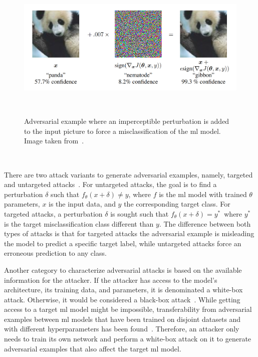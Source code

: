 \begin{figure}[ht]
  \includegraphics[scale=0.35]{figures/adversarial_example.png}
  \centering
  \caption{Adversarial example where an imperceptible perturbation is added to the input picture to force a misclassification of the \ac{ml} model. Image taken from~\cite{goodfellow_explaining_2015}.}
~\label{fig:adversarial_example}
\end{figure} \

There are two attack variants to generate adversarial examples, namely,
targeted and untargeted attacks~\cite{huang_adversarial_nodate}. For
untargeted attacks, the goal is to find a perturbation \(\delta\) such
that \(f_{\theta}\left(x + \delta\right) \neq y\), where \(f\) is the
\ac{ml} model with trained \(\theta\) parameters, \(x\) is the input
data, and \(y\) the corresponding target class. For targeted attacks,
a perturbation \(\delta\) is sought such that \(f_{\theta}
\left(x + \delta\right) = y^{\ast}\)\, where \(y^{\ast}\) is the
target misclassification class different than \(y\). The difference
between both types of attacks is that for targeted attacks the
adversarial example is misleading the model to predict a specific
target label, while untargeted attacks force an erroneous prediction
to any class. \

Another category to characterize adversarial attacks is based on the
available information for the attacker. If the attacker has access
to the model's architecture, its training data, and parameters, it
is denominated a white-box attack. Otherwise, it would be considered
a black-box attack~\cite{eykholt_robust_2018}. While getting access to a
target \ac{ml} model might be impossible, transferability from
adversarial examples between \ac{ml} models that have been trained
on disjoint datasets and with different hyperparameters has been
found~\cite{papernot_transferability_2016}. Therefore, an attacker
only needs to train its own network and perform a white-box attack
on it to generate adversarial examples that also affect the target
\ac{ml} model.\

